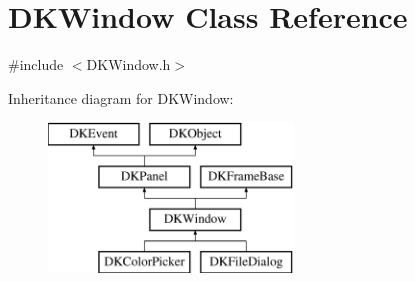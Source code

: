 \hypertarget{class_d_k_window}{\section{D\-K\-Window Class Reference}
\label{class_d_k_window}
}


{\ttfamily \#include $<$D\-K\-Window.\-h$>$}

Inheritance diagram for D\-K\-Window\-:\begin{figure}[H]
\begin{center}
\leavevmode
\includegraphics[height=4.000000cm]{class_d_k_window}
\end{center}
\end{figure}
